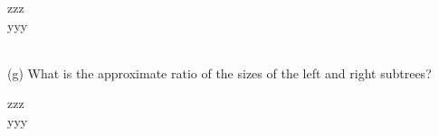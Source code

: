\documentclass[12pt]{article}
\begin{document}
\begin{enumerate}

{\color{blue}
zzz\\
yyy\\\\
}




(g) 
What is the approximate ratio of the sizes of the left and right subtrees?  

{\color{blue}
zzz\\
yyy
}


\end{enumerate} 
\end{document}
